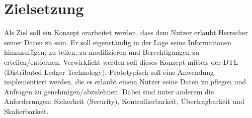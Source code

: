 \chapter{Zielsetzung}
\label{cha:beispiele}
Als Ziel soll ein Konzept erarbeitet werden, dass dem Nutzer erlaubt Herrscher seiner Daten zu sein. Er soll eigenständig in der Lage seine Informationen hinzuzufügen, zu teilen, zu modifizieren und Berechtigungen zu erteilen/entfernen. Verwirklicht werden soll dieses Konzept mittels der DTL (Distributed Ledger Technology). Prototypisch soll eine Anwendung implementiert werden, die es erlaubt einem Nutzer seine Daten zu pflegen und Anfragen zu genehmigen/abzulehnen. Dabei sind unter anderem die Anforderungen: Sicherheit (Security), Kontrollierbarkeit, Übertragbarkeit und Skalierbarkeit.